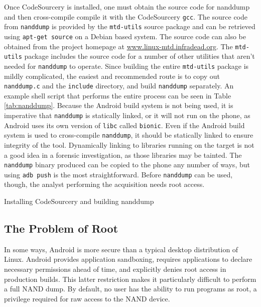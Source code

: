Once CodeSourcery is installed, one must obtain the source code for nanddump and then cross-compile compile it with the CodeSourcery
\texttt{gcc}.  The source code from \texttt{nanddump} is provided by the \texttt{mtd-utils} source package and can be retrieved
using \texttt{apt-get source} on a Debian based system.  The source code can also be obtained from the project homepage at
\url{www.linux-mtd.infradead.org}.  The \texttt{mtd-utils} package includes the source code for a number of other utilities that
aren't needed for \texttt{nanddump} to operate.  Since building the entire \texttt{mtd-utils} package is mildly complicated, the
easiest and recommended route is to copy out \texttt{nanddump.c} and the \texttt{include} directory, and build \texttt{nanddump}
separately.  An example shell script that performs the entire process can be seen in Table \ref{tab:nanddump}.  Because the Android
build system is not being used, it is imperative that \texttt{nanddump} is statically linked, or it will not run on the phone, as
Android uses its own version of \texttt{libc} called \texttt{bionic}.  Even if the Android build system is used to cross-compile
\texttt{nanddump}, it should be statically linked to ensure integrity of the tool.  Dynamically linking to libraries running on the
target is not a good idea in a forensic investigation, as those libraries may be tainted.  The \texttt{nanddump} binary produced can
be copied to the phone any number of ways, but using \texttt{adb push} is the most straightforward.  Before \texttt{nanddump} can be
used, though, the analyst performing the acquisition needs root access.

\begin{table}[htb]

\caption{Installing CodeSourcery and building nanddump}
\label{tab:nanddump}
\end{table}

\subsection{The Problem of Root}
In some ways, Android is more secure than a typical desktop distribution of Linux.  Android provides application sandboxing,
requires applications to declare necessary permissions ahead of time, and explicitly denies root access in production builds. This
latter restriction makes it particularly difficult to perform a full NAND dump.  By default, no user has the ability to run programs
as root, a privilege required for raw access to the NAND device.  

